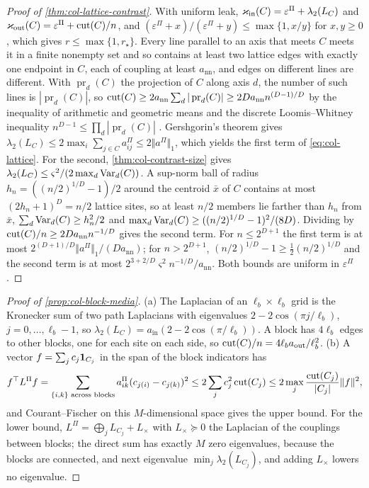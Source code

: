 \begin{proof}[Proof of \cref{thm:col-lattice-contrast}]
With uniform leak, $\varkappa_{\mathrm{in}}(C)=\varepsilon^\Pi+\lambda_2(L_C)$ and $\varkappa_{\mathrm{out}}(C)=\varepsilon^\Pi+\operatorname{cut}(C)/n$, and $(\varepsilon^\Pi+x)/(\varepsilon^\Pi+y)\le\max\{1,x/y\}$ for $x,y\ge0$, which gives $r\le\max\{1,r_\star\}$. Every line parallel to an axis that meets $C$ meets it in a finite nonempty set and so contains at least two lattice edges with exactly one endpoint in $C$, each of coupling at least $a_{\mathrm{nn}}$, and edges on different lines are different. With $\operatorname{pr}_d(C)$ the projection of $C$ along axis $d$, the number of such lines is $|\operatorname{pr}_d(C)|$, so $\operatorname{cut}(C)\ge2a_{\mathrm{nn}}\sum_d|\operatorname{pr}_d(C)|\ge2Da_{\mathrm{nn}}n^{(D-1)/D}$ by the inequality of arithmetic and geometric means and the discrete Loomis--Whitney inequality $n^{D-1}\le\prod_d|\operatorname{pr}_d(C)|$ \citep{loomis1949inequality}. Gershgorin's theorem gives $\lambda_2(L_C)\le2\max_i\sum_{j\in C}a^\Pi_{ij}\le2\Vert a^\Pi\Vert_1$, which yields the first term of \eqref{eq:col-lattice}. For the second, \cref{thm:col-contrast-size} gives $\lambda_2(L_C)\le\varsigma^2/(2\max_d\operatorname{Var}_d(C))$. A sup-norm ball of radius $h_n=((n/2)^{1/D}-1)/2$ around the centroid $\bar x$ of $C$ contains at most $(2h_n+1)^D=n/2$ lattice sites, so at least $n/2$ members lie farther than $h_n$ from $\bar x$, $\sum_d\operatorname{Var}_d(C)\ge h_n^2/2$ and $\max_d\operatorname{Var}_d(C)\ge((n/2)^{1/D}-1)^2/(8D)$. Dividing by $\operatorname{cut}(C)/n\ge2Da_{\mathrm{nn}}n^{-1/D}$ gives the second term. For $n\le2^{D+1}$ the first term is at most $2^{(D+1)/D}\Vert a^\Pi\Vert_1/(Da_{\mathrm{nn}})$; for $n>2^{D+1}$, $(n/2)^{1/D}-1\ge\frac12(n/2)^{1/D}$ and the second term is at most $2^{3+2/D}\varsigma^2n^{-1/D}/a_{\mathrm{nn}}$. Both bounds are uniform in $\varepsilon^\Pi$.
\end{proof}

\begin{proof}[Proof of \cref{prop:col-block-media}]
(a) The Laplacian of an $\ell_b\times\ell_b$ grid is the Kronecker sum of two path Laplacians with eigenvalues $2-2\cos(\pi j/\ell_b)$, $j=0,\dots,\ell_b-1$, so $\lambda_2(L_C)=a_{\mathrm{in}}(2-2\cos(\pi/\ell_b))$. A block has $4\ell_b$ edges to other blocks, one for each site on each side, so $\operatorname{cut}(C)/n=4\ell_ba_{\mathrm{out}}/\ell_b^2$. (b) A vector $f=\sum_jc_j\mathbf{1}_{C_j}$ in the span of the block indicators has
\[
f^\top L^\Pi f=\sum_{\{i,k\}\text{ across blocks}}a^\Pi_{ik}(c_{j(i)}-c_{j(k)})^2\le2\sum_jc_j^2\operatorname{cut}(C_j)\le2\max_j\frac{\operatorname{cut}(C_j)}{|C_j|}\Vert f\Vert^2,
\]
and Courant--Fischer on this $M$-dimensional space gives the upper bound. For the lower bound, $L^\Pi=\bigoplus_jL_{C_j}+L_\times$ with $L_\times\succeq0$ the Laplacian of the couplings between blocks; the direct sum has exactly $M$ zero eigenvalues, because the blocks are connected, and next eigenvalue $\min_j\lambda_2(L_{C_j})$, and adding $L_\times$ lowers no eigenvalue.
\end{proof}


